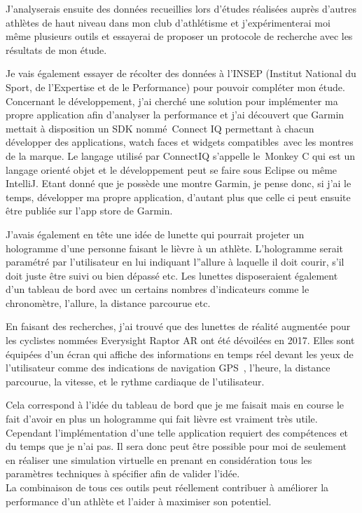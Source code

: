 J'analyserais ensuite des données recueillies lors d'études réalisées auprès d'autres athlètes de haut niveau dans mon club d’athlétisme et j'expérimenterai moi même plusieurs outils et essayerai de proposer un protocole de recherche avec les résultats de mon étude.

Je vais également essayer de récolter des données à l'INSEP (Institut National du Sport, de l'Expertise et de le Performance) pour pouvoir compléter mon étude.\\

Concernant le développement, j’ai cherché une solution pour implémenter ma propre application afin d'analyser la performance et j’ai découvert que Garmin mettait à disposition un SDK nommé Connect IQ permettant à chacun développer des applications, watch faces et widgets compatibles avec les montres de la marque. Le langage utilisé par ConnectIQ s’appelle le Monkey C qui est un langage orienté objet et le développement peut se faire sous Eclipse ou même IntelliJ.
Etant donné que je possède une montre Garmin, je pense donc, si j'ai le temps, développer ma propre application, d'autant plus que celle ci peut ensuite être publiée sur l'app store de Garmin.

J'avais également en tête une idée de lunette qui pourrait projeter un hologramme d'une personne faisant le lièvre à un athlète. L'hologramme serait paramétré par l'utilisateur en lui indiquant l''allure à laquelle il doit courir, s'il doit juste être suivi ou bien dépassé etc. Les lunettes disposeraient  également d'un tableau de bord avec un certains nombres d'indicateurs comme le chronomètre, l'allure, la distance parcourue etc.

En faisant des recherches, j'ai trouvé que des lunettes de réalité augmentée pour les cyclistes nommées Everysight Raptor AR ont été dévoilées en 2017. Elles sont équipées d'un écran qui affiche des informations en temps réel  devant les yeux de l'utilisateur comme des indications de navigation GPS , l’heure, la distance parcourue, la vitesse, et le rythme cardiaque de l’utilisateur. 

Cela correspond à l'idée du tableau de bord que  je me faisait mais en course le fait d'avoir en plus un hologramme qui fait lièvre est vraiment très utile. Cependant l'implémentation d'une telle application requiert des compétences et du temps que je n'ai pas. Il sera donc peut être possible pour moi de seulement en réaliser une simulation virtuelle en prenant en considération tous les paramètres techniques à spécifier afin de valider l'idée.\\


La combinaison de tous ces outils peut réellement contribuer à améliorer la performance d'un athlète et l'aider à maximiser son potentiel.\\
        
